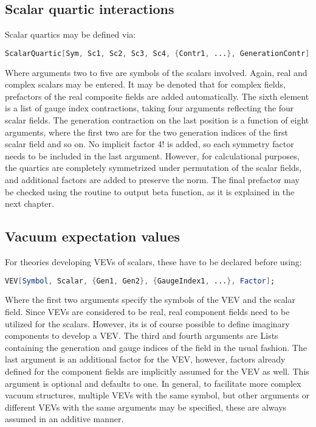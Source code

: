 \documentclass{scrartcl}
\begin{document}
\subsection{Scalar quartic interactions}
Scalar quartics may be defined via:
\begin{lstlisting}[language=mathematica,mathescape,columns=flexible,backgroundcolor=\color{light-gray}]
ScalarQuartic[Sym, Sc1, Sc2, Sc3, Sc4, {Contr1, ...}, GenerationContr];
\end{lstlisting}
Where arguments two to five are symbols of the scalars involved. Again, real and complex scalars may be entered. It may be denoted that for complex fields, prefactors of the real composite fields are added automatically. The sixth element is a list of gauge index contractions, taking four arguments reflecting the four scalar fields. The generation contraction on the last position is a function of eight arguments, where the first two are for the two generation indices of the first scalar field and so on. \newline No implicit factor 4! is added, so each symmetry factor needs to be included in the last argument. However, for calculational purposes, the quartics are completely symmetrized under permutation of the scalar fields, and additional factors are added to preserve the norm. The final prefactor may be checked using the routine to output beta function, as it is explained in the next chapter.
\FloatBarrier
\subsection{Vacuum expectation values}
For theories developing VEVs of scalars, these have to be declared before using:
\begin{lstlisting}[language=mathematica,mathescape,columns=flexible,backgroundcolor=\color{light-gray}]
VEV[Symbol, Scalar, {Gen1, Gen2}, {GaugeIndex1, ...}, Factor];
\end{lstlisting}
Where the first two arguments specify the symbols of the VEV and the scalar field. Since VEVs are considered to be real, real component fields need to be utilized for the scalars. However, its is of course possible to define imaginary components to develop a VEV. The third and fourth arguments are Lists containing the generation and gauge indices of the field in the usual fashion. The last argument is an additional factor for the VEV, however, factors already defined for the component fields are implicitly assumed for the VEV as well. This argument is optional and defaults to one. In general, to facilitate more complex vacuum structures, multiple VEVs with the same symbol, but other arguments or different VEVs with the same arguments may be specified, these are always assumed in an additive manner.
\FloatBarrier
\end{document}

